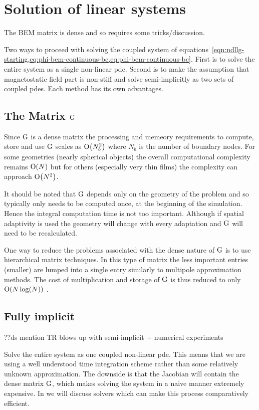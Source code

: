 
\chapter{Solution of linear systems}
\label{sec:solution-strategies}

The BEM matrix is dense and so requires some tricks/discussion.

Two ways to proceed with solving the coupled system of equations~\cref{eqn:ndllg-starting,eq:phi-bem-continuous-bc,eq:phi-bem-continuous-bc}.
First is to solve the entire system as a single non-linear pde.
Second is to make the assumption that magnetostatic field part is non-stiff and solve semi-implicitly as two sets of coupled pdes.
Each method has its own advantages.


\section{The Matrix ${\mathbf{\mathrm{G}}}$}

Since ${\mathbf{\mathrm{G}}}$ is a dense matrix the processing and memeory requirements to compute, store and use ${\mathbf{\mathrm{G}}}$ scales as $\text{O}{\left( N_b^2 \right)}$ where $N_b$ is the number of boundary nodes. For some geometries (\eg nearly spherical objects) the overall computational complexity remains $\text{O}{\left( N \right)}$ but for others (especially very thin films) the complexity can approach $\text{O}{\left( N^2 \right)}$.

It should be noted that ${\mathbf{\mathrm{G}}}$ depends only on the geometry of the problem and so typically only needs to be computed once, at the beginning of the simulation. Hence the integral computation time is not too important. Although if spatial adaptivity is used the geometry will change with every adaptation and ${\mathbf{\mathrm{G}}}$ will need to be recalculated.

One way to reduce the problems associated with the dense nature of ${\mathbf{\mathrm{G}}}$ is to use hierarchical matrix techniques. In this type of matrix the less important entries (\ie smaller) are lumped into a single entry similarly to multipole approximation methods. The cost of multiplication and storage of ${\mathbf{\mathrm{G}}}$ is thus reduced to only $\text{O}{\left( N \log(N) \right)}$ \cite{Knittel2009}.


\section{Fully implicit}
\label{sec:fully-implicit-bem}

??ds mention TR blows up with semi-implicit + numerical experiments

Solve the entire system as one coupled non-linear pde.
This means that we are using a well understood time integration scheme rather than some relatively unknown approximation.
The downside is that the Jacobian will contain the dense matrix ${\mathbf{\mathrm{G}}}$, which makes solving the system in a naive manner extremely expensive.
In  we will discuss solvers which can make this process comparatively efficient.

